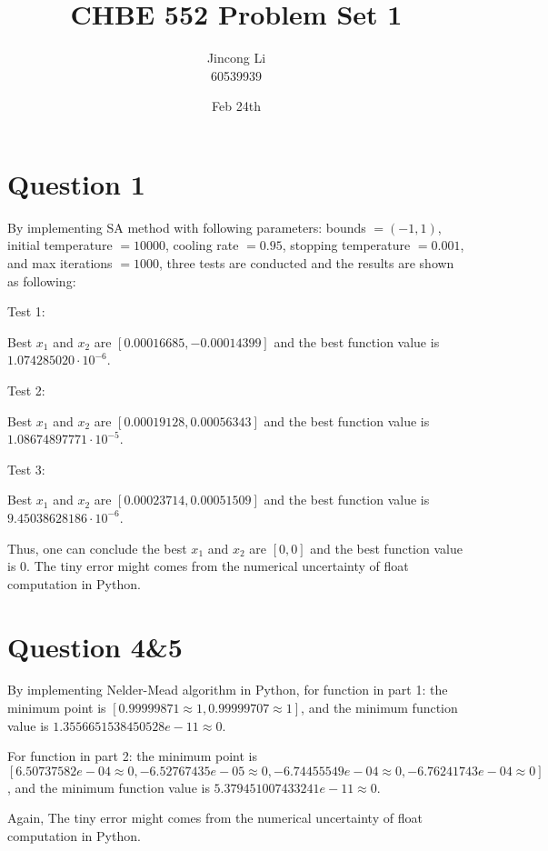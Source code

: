 \documentclass[a4paper,12pt]{article} %
\begin{document}
\setlength{\parskip}{1em} 
\setlength{\parindent}{0pt}
\newcommand{\vect}[1]{\mathbf{#1}}

\title{CHBE 552 Problem Set 1}
\author{Jincong Li \\ 60539939}
\date{Feb 24th}
\maketitle

\section*{\textbf{Question 1}}
By implementing SA method with following parameters: bounds $= (-1, 1)$, initial temperature $= 10000$, cooling rate $= 0.95$, stopping temperature $= 0.001$, and max iterations $= 1000$,
three tests are conducted and the results are shown as following:

Test 1:

Best $x_1$ and $x_2$ are $[ 0.00016685, -0.00014399]$ and the
best function value is $1.074285020 \cdot 10^{-6}$.

Test 2:

Best $x_1$ and $x_2$ are $[0.00019128, 0.00056343]$ and the
best function value is $1.08674897771 \cdot 10^{-5}$.

Test 3:

Best $x_1$ and $x_2$ are $[0.00023714, 0.00051509]$ and the
best function value is $9.45038628186 \cdot 10^{-6}$.

Thus, one can conclude the best $x_1$ and $x_2$ are $[0, 0]$ and the
best function value is $0$. The tiny error might comes from the numerical uncertainty of float computation in Python.

\section*{\textbf{Question 4\&5}}
By implementing Nelder-Mead algorithm in Python, for function in part 1: the minimum point is $[0.99999871\approx 1, 0.99999707\approx 1]$, and the
minimum function value is $1.3556651538450528e-11 \approx 0 $.

For function in part 2: the minimum point is $[ 6.50737582e-04\approx 0, -6.52767435e-05\approx 0, -6.74455549e-04\approx 0, -6.76241743e-04\approx 0]$, and the
minimum function value is $5.379451007433241e-11 \approx 0 $.

Again, The tiny error might comes from the numerical uncertainty of float computation in Python.
\end{document}

